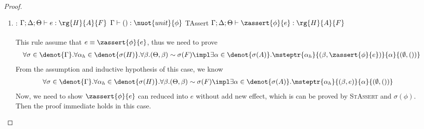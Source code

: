 \begin{proof}
\begin{enumerate}[label=Case]
\item:
{\footnotesize
\mprooftr{45mm}
{$\Gamma;\Delta;\Theta \vdash e : \rg{H}{A}{F}$ \quad
$\Gamma \vdash () : \nuot{unit}{\phi}$}
{TAssert}
{$\Gamma;\Delta;\Theta \vdash \zassert{\phi}{e} : \rg{H}{A}{F}  $}
\ \\ \ \\}
This rule assume that $e \equiv \zassert{\phi}{e}$, thus we need to prove
{\footnotesize\begin{align*}
 \forall \sigma \in \denot{\Gamma}.\forall \alpha_h \in \denot{\sigma(H)}. \forall \beta. (\Theta, \beta) \sim \sigma(F) \impl \exists \alpha \in\denot{\sigma(A)}. \msteptr{\alpha_h}{(\beta, \zassert{\phi}{e})}{\alpha}{(\emptyset, ())}
\end{align*}}\noindent
From the assumption and inductive hypothesis of this case, we know
{\footnotesize\begin{align*}
    & \forall \sigma \in \denot{\Gamma}.\forall \alpha_h \in \denot{\sigma(H)}. \forall \beta. (\Theta, \beta) \sim \sigma(F) \impl \exists \alpha \in\denot{\sigma(A)}. \msteptr{\alpha_h}{(\beta, e)}{\alpha}{(\emptyset, ())}
\end{align*}}\noindent
Now, we need to show $\zassert{\phi}{e}$ can reduced into $e$ without add new effect, which is can be proved by \textsc{StAssert} and $\sigma(\phi)$. Then the proof immediate holds in this case.


\end{enumerate}
\end{proof}
